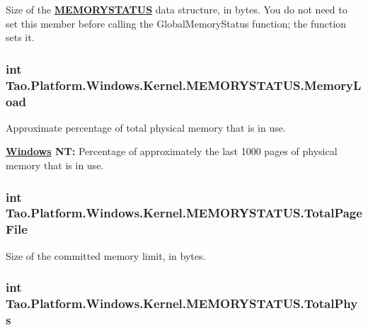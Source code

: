 Size of the {\bfseries \hyperlink{struct_tao_1_1_platform_1_1_windows_1_1_kernel_1_1_m_e_m_o_r_y_s_t_a_t_u_s}{MEMORYSTATUS}} data structure, in bytes. You do not need to set this member before calling the GlobalMemoryStatus function; the function sets it. 

\hypertarget{struct_tao_1_1_platform_1_1_windows_1_1_kernel_1_1_m_e_m_o_r_y_s_t_a_t_u_s_a11e7d82ba85b8c714713591f3146efac}{
\subsubsection[{MemoryLoad}]{\setlength{\rightskip}{0pt plus 5cm}int {\bf Tao.Platform.Windows.Kernel.MEMORYSTATUS.MemoryLoad}}}
\label{struct_tao_1_1_platform_1_1_windows_1_1_kernel_1_1_m_e_m_o_r_y_s_t_a_t_u_s_a11e7d82ba85b8c714713591f3146efac}


Approximate percentage of total physical memory that is in use. 

{\bfseries \hyperlink{namespace_tao_1_1_platform_1_1_windows}{Windows} NT:} Percentage of approximately the last 1000 pages of physical memory that is in use. 

\hypertarget{struct_tao_1_1_platform_1_1_windows_1_1_kernel_1_1_m_e_m_o_r_y_s_t_a_t_u_s_a15193be7574ab91d6d486631e796478b}{
\subsubsection[{TotalPageFile}]{\setlength{\rightskip}{0pt plus 5cm}int {\bf Tao.Platform.Windows.Kernel.MEMORYSTATUS.TotalPageFile}}}
\label{struct_tao_1_1_platform_1_1_windows_1_1_kernel_1_1_m_e_m_o_r_y_s_t_a_t_u_s_a15193be7574ab91d6d486631e796478b}


Size of the committed memory limit, in bytes. 

\hypertarget{struct_tao_1_1_platform_1_1_windows_1_1_kernel_1_1_m_e_m_o_r_y_s_t_a_t_u_s_ab03b478046b30bab5267b21008d9d330}{
\subsubsection[{TotalPhys}]{\setlength{\rightskip}{0pt plus 5cm}int {\bf Tao.Platform.Windows.Kernel.MEMORYSTATUS.TotalPhys}}}
\label{struct_tao_1_1_platform_1_1_windows_1_1_kernel_1_1_m_e_m_o_r_y_s_t_a_t_u_s_ab03b478046b30bab5267b21008d9d330}


